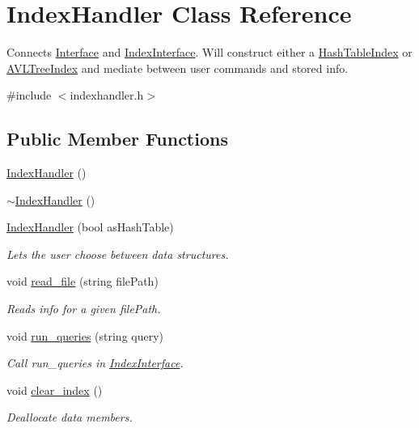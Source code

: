 \hypertarget{class_index_handler}{}\section{Index\+Handler Class Reference}
\label{class_index_handler}


Connects \hyperlink{class_interface}{Interface} and \hyperlink{class_index_interface}{Index\+Interface}. Will construct either a \hyperlink{class_hash_table_index}{Hash\+Table\+Index} or \hyperlink{class_a_v_l_tree_index}{A\+V\+L\+Tree\+Index} and mediate between user commands and stored info.  




{\ttfamily \#include $<$indexhandler.\+h$>$}

\subsection*{Public Member Functions}
\begin{DoxyCompactItemize}
\item 
\hyperlink{class_index_handler_a27748387661142a2eb545be6f0499996}{Index\+Handler} ()
\item 
\hyperlink{class_index_handler_ad787ca8cf83345ecfe332d2c3b8f8009}{$\sim$\+Index\+Handler} ()
\item 
\hyperlink{class_index_handler_ae50be3bec7e5ad3ede66110535043e15}{Index\+Handler} (bool as\+Hash\+Table)
\begin{DoxyCompactList}\small\item\em Lets the user choose between data structures. \end{DoxyCompactList}\item 
void \hyperlink{class_index_handler_a3fe9b3c1b3df7eea7e4ae590df4a4339}{read\+\_\+file} (string file\+Path)
\begin{DoxyCompactList}\small\item\em Reads info for a given file\+Path. \end{DoxyCompactList}\item 
void \hyperlink{class_index_handler_acee974285412a635c3c31fe86b9e0fb8}{run\+\_\+queries} (string query)
\begin{DoxyCompactList}\small\item\em Call run\+\_\+queries in \hyperlink{class_index_interface}{Index\+Interface}. \end{DoxyCompactList}\item 
void \hyperlink{class_index_handler_a417830272cfc725f6966c7a0a0ceae1d}{clear\+\_\+index} ()
\begin{DoxyCompactList}\small\item\em Deallocate data members. \end{DoxyCompactList}\end{DoxyCompactItemize}


